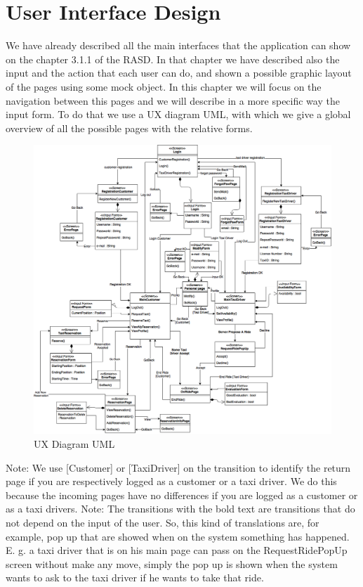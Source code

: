 \documentclass[../../dd.tex]{subfiles}
\begin{document}
	\chapter{User Interface Design}

	We have already described all the main interfaces that the application can show on the chapter 3.1.1 of the RASD. In that chapter we have  described also the input and the action that each user can do, and shown a possible graphic layout of the pages using some mock object. In this chapter we will focus on the navigation between this pages and we will describe in a more specific way the input form. To do that we use a UX diagram UML, with which we give a global overview of all the possible pages with the relative forms. 
	
	\begin{figure}[H]
				\centering
				\includegraphics[width=\textwidth, scale=0.5]{../images/UserInterfaces.png}
			\caption{UX Diagram UML}\label{fig:UXDiagram}
		\end{figure}
		
Note: We use [Customer] or [TaxiDriver] on the transition to identify the return page if you are respectively logged as a customer or a taxi driver. We do this because the incoming pages have no differences if you are logged as a customer or as a taxi drivers.
Note: The transitions with the bold text are transitions that do not depend on the input of the user. So, this kind of translations are, for example, pop up that are showed when on the system something has happened. E. g. a taxi driver that is on his main page can pass on the RequestRidePopUp screen without make any move, simply the pop up is shown when the system wants to ask to the taxi driver if he wants to take that ride.
\end{document}
